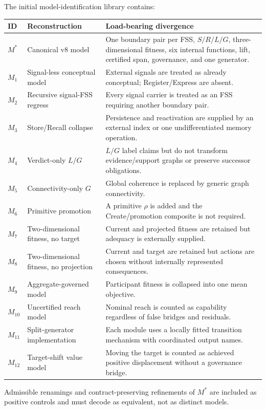\documentclass[11pt]{article}
\begin{document}
The initial model-identification library contains:
\begin{longtable}{p{}p{}p{}}
\toprule
\textbf{ID} & \textbf{Reconstruction} & \textbf{Load-bearing divergence}\\
\midrule\endhead
$M^\ast$ & Canonical v8 model & One boundary pair per FSS, $S/R/L/G$, three-dimensional fitness, six internal functions, lift, certified span, governance, and one generator.\\
$M_1$ & Signal-less conceptual model & External signals are treated as already conceptual; Register/Express are absent.\\
$M_2$ & Recursive signal-FSS regress & Every signal carrier is treated as an FSS requiring another boundary pair.\\
$M_3$ & Store/Recall collapse & Persistence and reactivation are supplied by an external index or one undifferentiated memory operation.\\
$M_4$ & Verdict-only $L/G$ & $L/G$ label claims but do not transform evidence/support graphs or preserve successor obligations.\\
$M_5$ & Connectivity-only $G$ & Global coherence is replaced by generic graph connectivity.\\
$M_6$ & Primitive promotion & A primitive $\rho$ is added and the Create/promotion composite is not required.\\
$M_7$ & Two-dimensional fitness, no target & Current and projected fitness are retained but adequacy is externally supplied.\\
$M_8$ & Two-dimensional fitness, no projection & Current and target are retained but actions are chosen without internally represented consequences.\\
$M_9$ & Aggregate-governed model & Participant fitness is collapsed into one mean objective.\\
$M_{10}$ & Uncertified reach model & Nominal reach is counted as capability regardless of false bridges and residuals.\\
$M_{11}$ & Split-generator implementation & Each module uses a locally fitted transition mechanism with coordinated output names.\\
$M_{12}$ & Target-shift value model & Moving the target is counted as achieved positive displacement without a governance bridge.\\
\bottomrule
\end{longtable}
Admissible renamings and contract-preserving refinements of $M^\ast$ are included as positive controls and must decode as equivalent, not as distinct models.
\end{document}
